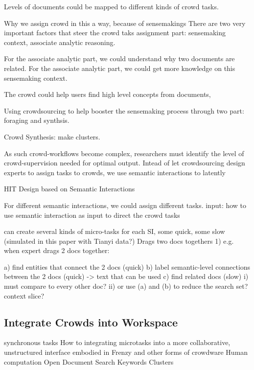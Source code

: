 \documentclass[journal]{vgtc}                %
\begin{document}
Levels of documents could be mapped to different kinds of crowd tasks.

Why we assign crowd in this a way, because of sensemakings
There are two very important factors that steer the crowd taks assignment part: sensemaking context, associate analytic reasoning.

For the associate analytic part, we could understand why two documents are related.
For the associate analytic part, we could get more knowledge on this sensemaking context.

The crowd could help users find high level concepts from documents,

Using crowdsourcing to help booster the sensemaking process through two part: foraging and synthsis.

Crowd Synthesis: make clusters.

As such crowd-workflows become complex, researchers must identify the level of crowd-supervision needed for optimal output.
Intead of let crowdsourcing design experts to assign tasks to crowds, we use semantic interactions to latently

HIT Design based on Semantic Interactions

For different semantic interactions, we could assign different tasks.
input:  how to use semantic interaction as input to direct the crowd tasks

can create several kinds of micro-tasks for each SI, some quick, some slow  (simulated in this paper with Tianyi data?) \newline
Drags two docs togethers
1) e.g. when expert drags 2 docs together:

a) find entities that connect the 2 docs (quick)
b) label semantic-level connections between the 2 docs (quick) -> text that can be used
c) find related docs (slow)
i) must compare to every other doc?
ii) or use (a) and (b) to reduce the search set?  context slice?\newline

\subsection{Integrate Crowds into Workspace}

synchronous tasks
How to integrating microtasks into a more collaborative, unstructured interface embodied in Frenzy and other forms of crowdware
Human computation
Open Document
Search Keywords\newline
Clusters \newline
\end{document}
